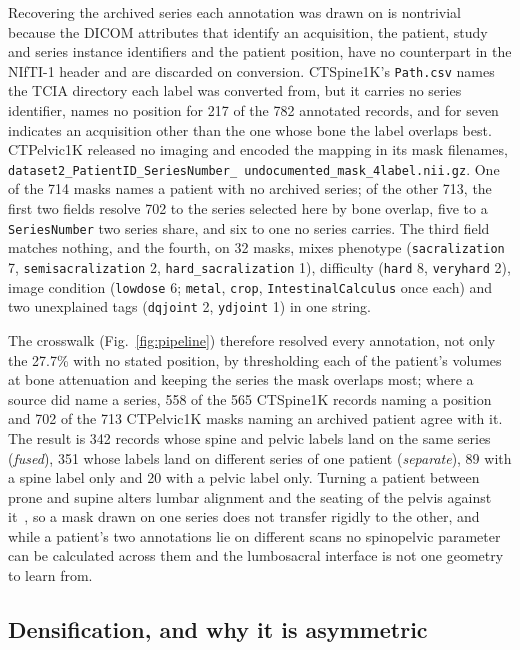 \documentclass[aapm,mph,amsmath,amssymb,preprint,linenumbers]{revtex4-2}
\begin{document}
Recovering the archived series each annotation was drawn on is nontrivial because the DICOM
attributes that identify an acquisition, the patient, study and series instance identifiers
and the patient position,\cite{dicomps3} have no counterpart in the NIfTI-1
header\cite{nifti1} and are discarded on conversion.\cite{li2016} CTSpine1K's
\texttt{Path.csv} names the TCIA directory each label was converted from, but it carries no
series identifier, names no position for 217 of the 782 annotated records, and for seven
indicates an acquisition other than the one whose bone the label overlaps best.
CTPelvic1K released no imaging and encoded the mapping in its mask filenames,
\texttt{dataset2\_\allowbreak PatientID\_\allowbreak SeriesNumber\_\allowbreak
undocumented\_\allowbreak [tag\_]\allowbreak mask\_4label.nii.gz}. One of the 714 masks names a
patient with no archived series; of the other 713, the first two fields resolve 702 to the
series selected here by bone overlap, five to a \texttt{SeriesNumber} two series share, and six
to one no series carries. The third field matches nothing, and the fourth, on 32 masks, mixes
phenotype (\texttt{sacralization} 7, \texttt{semisacralization} 2,
\texttt{hard\_sacralization} 1), difficulty (\texttt{hard} 8, \texttt{veryhard} 2), image
condition (\texttt{lowdose} 6; \texttt{metal}, \texttt{crop}, \texttt{IntestinalCalculus} once
each) and two unexplained tags (\texttt{dqjoint} 2, \texttt{ydjoint} 1) in one string.

The crosswalk (Fig.~\ref{fig:pipeline}) therefore resolved every annotation, not only the
27.7\% with no stated position, by thresholding each of the patient's volumes at bone
attenuation and keeping the series the mask overlaps most; where a source did name a series,
558 of the 565 CTSpine1K records naming a position and 702 of the 713 CTPelvic1K masks naming
an archived patient agree with it. The result is 342 records whose spine and pelvic labels
land on the same series (\emph{fused}), 351 whose labels land on different series of one
patient (\emph{separate}), 89 with a spine label only and 20 with a pelvic label only. Turning
a patient between prone and supine alters lumbar alignment and the seating of the pelvis
against it~\cite{hasegawa2018}, so a mask drawn on one series does not transfer rigidly to the
other, and while a patient's two annotations lie on different scans no spinopelvic parameter
can be calculated across them and the lumbosacral interface is not one geometry to learn from.

\subsection{Densification, and why it is asymmetric}
\end{document}
